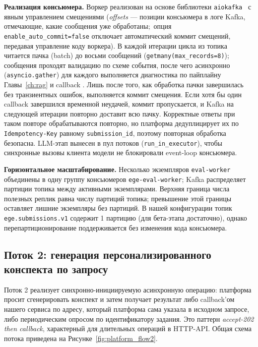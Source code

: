 \documentclass[a4paper,12pt]{extarticle}
\newcommand{\code}[1]{\texttt{\seqsplit{#1}}}
\begin{document}
\textbf{Реализация консьюмера.} Воркер реализован на основе библиотеки
\texttt{aiokafka}~\cite{aiokafka} с явным управлением смещениями
(\textit{offsets} --- позиции консьюмера в логе Kafka, отмечающие, какие
сообщения уже обработаны;~опция \texttt{enable\_auto\_commit=false} отключает
автоматический коммит смещений, передавая управление коду воркера).
В каждой итерации цикла из топика читается пачка (batch) до восьми сообщений
(\texttt{getmany(max\_records=8)}); сообщения проходят валидацию по схеме события,
после чего асинхронно (\texttt{asyncio.gather}) для каждого выполняется диагностика
по пайплайну Главы~\ref{ch:rag} и callback \code{POST /v1/submissions/\{id\}/diagnostic-tags}.
Лишь после того, как обработка пачки завершилась без транзиентных ошибок, выполняется
коммит смещения. Если хотя бы один callback завершился временной неудачей,
коммит пропускается, и Kafka на следующей итерации повторно доставит всю пачку.
Корректные ответы при таком повторе обрабатываются повторно, но платформа
дедуплицирует их по \texttt{Idempotency-Key} равному \texttt{submission\_id}, поэтому
повторная обработка безопасна. LLM-этап вынесен в пул потоков
(\texttt{run\_in\_executor}), чтобы синхронные вызовы клиента модели не блокировали
event-loop консьюмера.

\textbf{Горизонтальное масштабирование.} Несколько экземпляров \texttt{eval-worker}
объединены в одну группу консьюмеров \texttt{ege-eval-worker}; Kafka распределяет
партиции топика между активными экземплярами. Верхняя граница числа полезных
реплик равна числу партиций топика; превышение этой границы оставляет лишние
экземпляры без партиций. В нашей конфигурации топик \texttt{ege.submissions.v1}
содержит 1 партицию (для бета-этапа достаточно), однако перепартиционирование
поддерживается без изменения кода консьюмера.

\subsection{Поток 2: генерация персонализированного конспекта по запросу}
\label{subsec:flow2}

Поток 2 реализует синхронно-инициируемую асинхронную операцию: платформа просит
сгенерировать конспект и затем получает результат либо callback'ом нашего сервиса
по адресу, который платформа сама указала в исходном запросе, либо периодическим
опросом по идентификатору задания. Это паттерн \textit{accept-202 then callback},
характерный для длительных операций в HTTP-API. Общая схема потока приведена на
Рисунке~\ref{fig:platform_flow2}.
\end{document}
